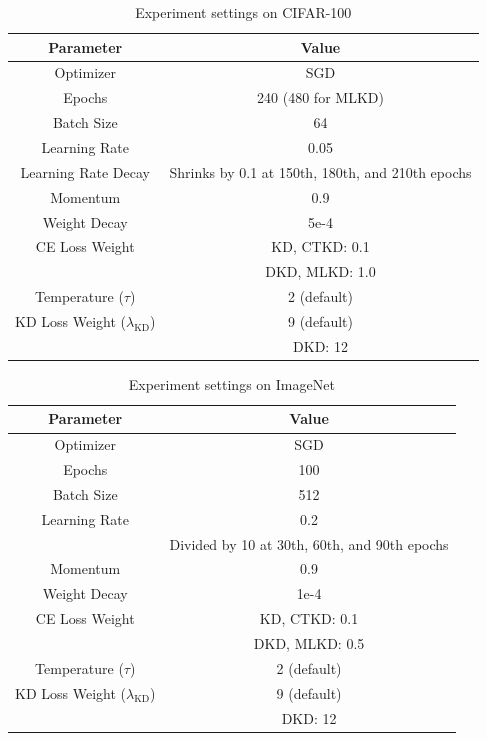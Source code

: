 \documentclass{article} %
\begin{document}
\begin{table}[ht]
\centering
\caption{Experiment settings on CIFAR-100}
\vspace{-0.3cm}
\begin{tabular}{c|c}
\toprule[1.2pt]
\textbf{Parameter} & \textbf{Value} \\ \midrule \midrule
Optimizer & SGD \\ \midrule 
Epochs & 240 (480 for MLKD) \\ \midrule
Batch Size & 64 \\ \midrule
Learning Rate & 0.05 \\ \midrule
Learning Rate Decay & Shrinks by 0.1 at 150th, 180th, and 210th epochs \\ \midrule
Momentum & 0.9 \\ \midrule
Weight Decay & 5e-4 \\ \midrule
CE Loss Weight & KD, CTKD: 0.1 \\
& DKD, MLKD: 1.0 \\ \midrule
Temperature ($\tau$) & 2 (default) \\ \midrule
KD Loss Weight ($\lambda_{\text{KD}}$) & 9 (default) \\
& DKD: 12 \\ \bottomrule[1.2pt]
\end{tabular}

\label{tab:cifar_setting}
\end{table}

\begin{table}[ht]
\caption{Experiment settings on ImageNet}
\vspace{-0,3cm}
\centering
\begin{tabular}{c|c}
\toprule[1.2pt]
\textbf{Parameter} & \textbf{Value} \\ \midrule \midrule
Optimizer & SGD \\ \midrule
Epochs & 100 \\ \midrule
Batch Size & 512 \\ \midrule
Learning Rate & 0.2 \\
& Divided by 10 at 30th, 60th, and 90th epochs \\ \midrule
Momentum & 0.9 \\ \midrule
Weight Decay & 1e-4 \\ \midrule
CE Loss Weight & KD, CTKD: 0.1 \\
& DKD, MLKD: 0.5 \\ \midrule
Temperature ($\tau$) & 2 (default) \\ \midrule
KD Loss Weight ($\lambda_{\text{KD}}$) & 9 (default) \\
& DKD: 12 \\ \bottomrule[1.2pt]
\end{tabular}

\label{tab:imagenet_setting}
\end{table}
\end{document}
